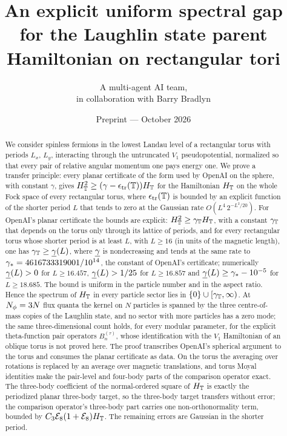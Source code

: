 \documentclass[11pt]{article}
\title{An explicit uniform spectral gap for the Laughlin state parent Hamiltonian on rectangular tori}
\author{A multi-agent AI team,\\ in collaboration with Barry Bradlyn}
\date{Preprint \quad---\quad 23 October 2026}
\begin{document}
\maketitle

\begin{abstract}
We consider spinless fermions in the lowest Landau level of a rectangular torus with periods $L_x$, $L_y$,
interacting through the untruncated $V_1$ pseudopotential, normalized so that every pair of relative angular
momentum one pays energy one. We prove a transfer principle: every planar certificate of the form used by OpenAI on the
sphere, with constant $\gamma$, gives $H_{\mathbb{T}}^2\ge(\gamma-\epsilon_{\mathrm{tr}}(\mathbb{T}))H_{\mathbb{T}}$ for the Hamiltonian $H_{\mathbb{T}}$ on the whole Fock
space of every rectangular torus, where $\epsilon_{\mathrm{tr}}(\mathbb{T})$ is bounded by an explicit function of the shorter period $L$
that tends to zero at the Gaussian rate $O(L^4\,2^{-L^2/20})$. For OpenAI's planar certificate the bounds are explicit: $H_{\mathbb{T}}^2\ge\gamma_{\mathbb{T}}H_{\mathbb{T}}$, with a
constant $\gamma_{\mathbb{T}}$ that depends on the torus only through its lattice of periods, and for every rectangular torus whose
shorter period is at least $L$, with $L\ge16$ (in units of the magnetic length), one has $\gamma_{\mathbb{T}}\ge\underline{\gamma}(L)$, where $\underline{\gamma}$ is
nondecreasing and tends at the same rate to $\gamma_{*}=4616733319001/10^{14}$, the constant of OpenAI's certificate;
numerically $\underline{\gamma}(L)>0$ for $L\ge16.457$, $\underline{\gamma}(L)>1/25$ for $L\ge16.857$ and $\underline{\gamma}(L)\ge\gamma_{*}-10^{-5}$ for $L\ge18.685$.
The bound is uniform in the particle number and in the aspect ratio. Hence the spectrum of $H_{\mathbb{T}}$ in every particle
sector lies in $\{0\}\cup[\gamma_{\mathbb{T}},\infty)$. At $N_{\phi}=3N$ flux quanta the kernel on $N$ particles is spanned by the three
centre-of-mass copies of the Laughlin state, and no sector with more particles has a zero mode; the same
three-dimensional count holds, for every modular parameter, for the explicit theta-function pair operators
$B_n^{(\tau)}$, whose identification with the $V_1$ Hamiltonian of an oblique torus is not proved here. The proof
transcribes OpenAI's spherical argument to the torus and consumes the planar certificate as data. On the torus the
averaging over rotations is replaced by an average over magnetic translations, and torus Moyal identities make the
pair-level and four-body parts of the comparison operator exact. The three-body coefficient of the normal-ordered
square of $H_{\mathbb{T}}$ is exactly the periodized planar three-body target, so the three-body target transfers without error;
the comparison operator's three-body part carries one non-orthonormality term, bounded by $C_{3}\mathcal{E}_8(1+\mathcal{E}_8)H_{\mathbb{T}}$. The
remaining errors are Gaussian in the shorter period.
\end{abstract}
\end{document}
